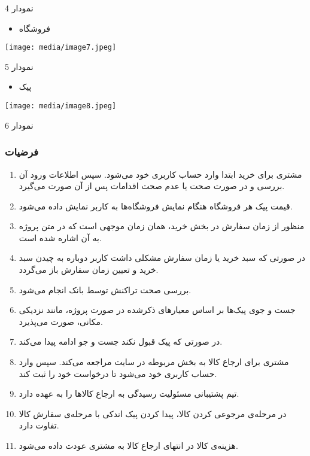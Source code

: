 \documentclass[]{article}
\begin{document}
نمودار 4

\begin{itemize}
\item
  فروشگاه
\end{itemize}

\texttt{[image: media/image7.jpeg]}

نمودار 5

\begin{itemize}
\item
  پیک
\end{itemize}

\texttt{[image: media/image8.jpeg]}

نمودار 6

\subsubsection{فرضیات}\label{ux641ux631ux636ux6ccux627ux62a}

\begin{enumerate}
\def\labelenumi{\arabic{enumi})}
\item
  مشتری برای خرید ابتدا وارد حساب کاربری خود می‌شود. سپس اطلاعات ورود آن
  بررسی و در صورت صحت یا عدم صحت اقدامات پس از آن صورت می‌گیرد.
\item
  قیمت پیک هر فروشگاه هنگام نمایش فروشگاه‌ها به کاربر نمایش داده می‌شود.
\item
  منظور از زمان سفارش در بخش خرید، همان زمان موجهی است که در متن پروژه
  به آن اشاره شده است.
\item
  در صورتی که سبد خرید یا زمان سفارش مشکلی داشت کاربر دوباره به چیدن سبد
  خرید و تعیین زمان سفارش باز می‌گردد.
\item
  بررسی صحت تراکنش توسط بانک انجام می‌شود.
\item
  جست و جوی پیک‌ها بر اساس معیارهای ذکرشده در صورت پروژه، مانند نزدیکی
  مکانی، صورت می‌پذیرد.
\item
  در صورتی که پیک قبول نکند جست و جو ادامه پیدا می‌کند.
\item
  مشتری برای ارجاع کالا به بخش مربوطه در سایت مراجعه می‌کند. سپس وارد
  حساب کاربری خود می‌شود تا درخواست خود را ثبت کند.
\item
  تیم پشتیبانی مسئولیت رسیدگی به ارجاع کالاها را به عهده دارد.
\item
  در مرحله‌ی مرجوعی کردن کالا، پیدا کردن پیک اندکی با مرحله‌ی سفارش کالا
  تفاوت دارد.
\item
  هزینه‌ی کالا در انتهای ارجاع کالا به مشتری عودت داده می‌شود.
\end{enumerate}
\end{document}
